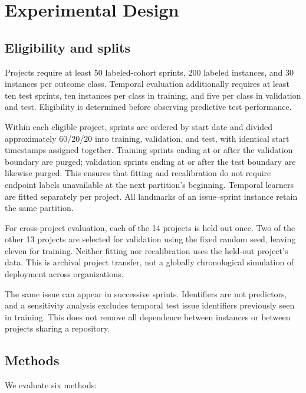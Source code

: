 \section{Experimental Design}\label{experimental-design}

\subsection{Eligibility and splits}\label{eligibility-and-splits}

Projects require at least 50 labeled-cohort sprints, 200 labeled instances, and 30 instances per outcome class. Temporal evaluation additionally requires at least ten test sprints, ten instances per class in training, and five per class in validation and test. Eligibility is determined before observing predictive test performance.

Within each eligible project, sprints are ordered by start date and divided approximately 60/20/20 into training, validation, and test, with identical start timestamps assigned together. Training sprints ending at or after the validation boundary are purged; validation sprints ending at or after the test boundary are likewise purged. This ensures that fitting and recalibration do not require endpoint labels unavailable at the next partition's beginning. Temporal learners are fitted separately per project. All landmarks of an issue--sprint instance retain the same partition.

For cross-project evaluation, each of the 14 projects is held out once. Two of the other 13 projects are selected for validation using the fixed random seed, leaving eleven for training. Neither fitting nor recalibration uses the held-out project's data. This is archival project transfer, not a globally chronological simulation of deployment across organizations.

The same issue can appear in successive sprints. Identifiers are not predictors, and a sensitivity analysis excludes temporal test issue identifiers previously seen in training. This does not remove all dependence between instances or between projects sharing a repository.

\subsection{Methods}\label{methods}

We evaluate six methods:

